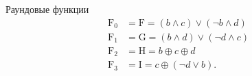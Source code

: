 Раундовые функции
\begin{align*}
    \mathrm{F_0} & = \mathrm{F} = (b \land c) \lor (\neg b \land d) \\
    \mathrm{F_1} & = \mathrm{G} = (b \land d) \lor (\neg d \land c) \\
    \mathrm{F_2} & = \mathrm{H} = b \oplus c \oplus d \\
    \mathrm{F_3} & = \mathrm{I} = c \oplus (\neg d \lor b).
\end{align*}


